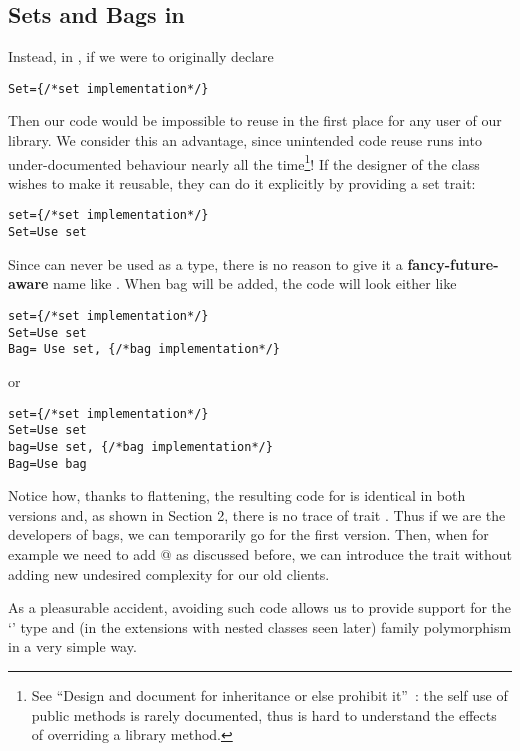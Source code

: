 \subsection{Sets and Bags in \name}
Instead, in \name, if we were to originally declare
\saveSpace\begin{lstlisting}
Set={/*set implementation*/} 
\end{lstlisting}\saveSpace
Then our code would be impossible to reuse in the first place for any user of our library.
We consider this an advantage, since unintended code reuse runs into under-documented behaviour nearly all the time\footnote{See
``Design and document for inheritance or else prohibit
it''~\cite{Bloch08}: the
self use of public methods is rarely documented, thus is hard to understand the effects of overriding a library method.
}!
If the designer of the \Q@Set@ class wishes to make it reusable, they can do it explicitly by providing a set trait:
\saveSpace\begin{lstlisting}
set={/*set implementation*/} 
Set=Use set
\end{lstlisting}\saveSpace
Since \Q@set@ can never be used as a type, there is no reason to give it a {\bf fancy-future-aware} name like
\Q@AbstractSetOrBag@.
When bag will be added, the code will look either like
\saveSpace\begin{lstlisting}
set={/*set implementation*/} 
Set=Use set
Bag= Use set, {/*bag implementation*/}
\end{lstlisting}\saveSpace\saveSpace
or 
\saveSpace\saveSpace\begin{lstlisting}
set={/*set implementation*/} 
Set=Use set
bag=Use set, {/*bag implementation*/}
Bag=Use bag
\end{lstlisting}\saveSpace
Notice how, thanks to flattening, the resulting code for \Q@Bag@ is identical in both versions
and, as shown in Section 2, there is no trace of trait \Q@bag@. 
Thus if we are the developers of bags, we can temporarily go for the first version.
Then, when for example we need to add @ as discussed before,
we can introduce the \Q@bag@ trait without adding new undesired complexity for our old clients.


As a pleasurable accident, avoiding such code allows us to provide support for the
`\Q@This@' type and (in the extensions with nested classes seen later)
family polymorphism in a very simple way.

